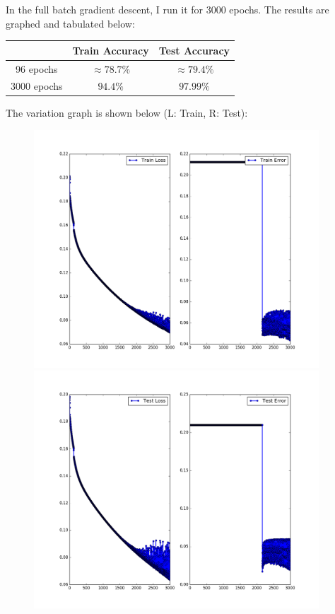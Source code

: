 \documentclass{article}
\begin{document}
\begin{flushleft}
In the full batch gradient descent, I run it for 3000 epochs. The results are graphed and tabulated below:
\begin{center}
\begin{tabular}{|c|c|c|}
\hline
& Train Accuracy & Test Accuracy \\
\hline
96 epochs & \(\approx 78.7\%\) & \(\approx 79.4\%\) \\
\hline
3000 epochs & \(94.4\%\) & \(97.99\%\) \\
\hline
\end{tabular}
\end{center}

The variation graph is shown below (L: Train, R: Test):
\begin{figure}[H]
\begin{minipage}{0.49\linewidth}
\centering
\includegraphics[width=0.95\textwidth]{Train-Statistics-sgd-batchsize=8143-mse.png}
\end{minipage}
\hfill
\begin{minipage}{0.49\linewidth}
\centering
\includegraphics[width=0.95\textwidth]{Test-Statistics-sgd-batchsize=8143-mse.png}
\end{minipage}
\end{figure}


\end{flushleft}
\end{document}
